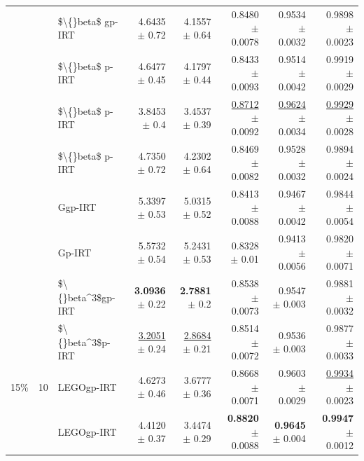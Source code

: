 \begin{longtable}{llp{}rrrrr}
 &  & \$\textbackslash\{\}beta\$ gp-IRT & 4.6435 {\scriptsize $\pm$ 0.72} & 4.1557 {\scriptsize $\pm$ 0.64} & 0.8480 {\scriptsize $\pm$ 0.0078} & 0.9534 {\scriptsize $\pm$ 0.0032} & 0.9898 {\scriptsize $\pm$ 0.0023} \\
 &  & \$\textbackslash\{\}beta\$ p-IRT & 4.6477 {\scriptsize $\pm$ 0.45} & 4.1797 {\scriptsize $\pm$ 0.44} & 0.8433 {\scriptsize $\pm$ 0.0093} & 0.9514 {\scriptsize $\pm$ 0.0042} & 0.9919 {\scriptsize $\pm$ 0.0029} \\
 &  & \$\textbackslash\{\}beta\$ p-IRT & 3.8453 {\scriptsize $\pm$ 0.4} & 3.4537 {\scriptsize $\pm$ 0.39} & \underline{0.8712} {\scriptsize $\pm$ 0.0092} & \underline{0.9624} {\scriptsize $\pm$ 0.0034} & \underline{0.9929} {\scriptsize $\pm$ 0.0028} \\
 &  & \$\textbackslash\{\}beta\$ p-IRT & 4.7350 {\scriptsize $\pm$ 0.72} & 4.2302 {\scriptsize $\pm$ 0.64} & 0.8469 {\scriptsize $\pm$ 0.0082} & 0.9528 {\scriptsize $\pm$ 0.0032} & 0.9894 {\scriptsize $\pm$ 0.0024} \\
 &  & Ggp-IRT & 5.3397 {\scriptsize $\pm$ 0.53} & 5.0315 {\scriptsize $\pm$ 0.52} & 0.8413 {\scriptsize $\pm$ 0.0088} & 0.9467 {\scriptsize $\pm$ 0.0042} & 0.9844 {\scriptsize $\pm$ 0.0054} \\
 &  & Gp-IRT & 5.5732 {\scriptsize $\pm$ 0.54} & 5.2431 {\scriptsize $\pm$ 0.53} & 0.8328 {\scriptsize $\pm$ 0.01} & 0.9413 {\scriptsize $\pm$ 0.0056} & 0.9820 {\scriptsize $\pm$ 0.0071} \\
 &  & \$\textbackslash\{\}beta\textasciicircum{}3\$gp-IRT & \textbf{3.0936} {\scriptsize $\pm$ 0.22} & \textbf{2.7881} {\scriptsize $\pm$ 0.2} & 0.8538 {\scriptsize $\pm$ 0.0073} & 0.9547 {\scriptsize $\pm$ 0.003} & 0.9881 {\scriptsize $\pm$ 0.0032} \\
 &  & \$\textbackslash\{\}beta\textasciicircum{}3\$p-IRT & \underline{3.2051} {\scriptsize $\pm$ 0.24} & \underline{2.8684} {\scriptsize $\pm$ 0.21} & 0.8514 {\scriptsize $\pm$ 0.0072} & 0.9536 {\scriptsize $\pm$ 0.003} & 0.9877 {\scriptsize $\pm$ 0.0033} \\
\midrule
15\% & 10 & LEGOgp-IRT & 4.6273 {\scriptsize $\pm$ 0.46} & 3.6777 {\scriptsize $\pm$ 0.36} & 0.8668 {\scriptsize $\pm$ 0.0071} & 0.9603 {\scriptsize $\pm$ 0.0029} & \underline{0.9934} {\scriptsize $\pm$ 0.0023} \\
 &  & LEGOgp-IRT & 4.4120 {\scriptsize $\pm$ 0.37} & 3.4474 {\scriptsize $\pm$ 0.29} & \textbf{0.8820} {\scriptsize $\pm$ 0.0088} & \textbf{0.9645} {\scriptsize $\pm$ 0.004} & \textbf{0.9947} {\scriptsize $\pm$ 0.0012} \\

\end{longtable}
